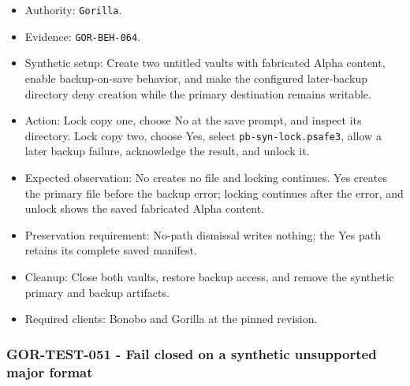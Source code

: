 \documentclass[
  letterpaper,
]{article}
\newcommand{\passthrough}[1]{#1}
\providecommand{\tightlist}{%
  \setlength{\itemsep}{0pt}\setlength{\parskip}{0pt}}
\begin{document}
\begin{itemize}
\tightlist
\item
  Authority: \passthrough{\lstinline!Gorilla!}.
\item
  Evidence: \nolinkurl{GOR-BEH-064}.
\item
  Synthetic setup: Create two untitled vaults with fabricated Alpha content, enable backup-on-save behavior, and make
  the configured later-backup directory deny creation while the primary destination remains writable.
\item
  Action: Lock copy one, choose No at the save prompt, and inspect its directory. Lock copy two, choose Yes, select
  \nolinkurl{pb-syn-lock.psafe3}, allow a later backup failure, acknowledge the result, and unlock it.
\item
  Expected observation: No creates no file and locking continues. Yes creates the primary file before the backup error;
  locking continues after the error, and unlock shows the saved fabricated Alpha content.
\item
  Preservation requirement: No-path dismissal writes nothing; the Yes path retains its complete saved manifest.
\item
  Cleanup: Close both vaults, restore backup access, and remove the synthetic primary and backup artifacts.
\item
  Required clients: Bonobo and Gorilla at the pinned revision.
\end{itemize}

\subsubsection{GOR-TEST-051 - Fail closed on a synthetic unsupported major
format}\label{gor-test-051---fail-closed-on-a-synthetic-unsupported-major-format}
\end{document}
